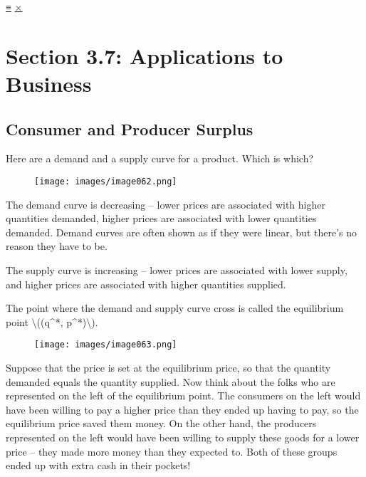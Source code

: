 \protect\hyperlink{main-nav}{≡} \protect\hyperlink{close-nav}{×}

\hypertarget{section-3.7-applications-to-business}{%
\section{Section 3.7: Applications to
Business}\label{section-3.7-applications-to-business}}

\hypertarget{consumer-and-producer-surplus}{%
\subsection{Consumer and Producer
Surplus}\label{consumer-and-producer-surplus}}

Here are a demand and a supply curve for a product. Which is which?

\begin{figure}
\centering
\texttt{[image: images/image062.png]}
\caption{}
\end{figure}

The demand curve is decreasing -- lower prices are associated with
higher quantities demanded, higher prices are associated with lower
quantities demanded. Demand curves are often shown as if they were
linear, but there's no reason they have to be.

The supply curve is increasing -- lower prices are associated with lower
supply, and higher prices are associated with higher quantities
supplied.

The point where the demand and supply curve cross is called the
equilibrium point \textbackslash{}((q\^{}*, p\^{}*)\textbackslash{}).

\begin{figure}
\centering
\texttt{[image: images/image063.png]}
\caption{}
\end{figure}

Suppose that the price is set at the equilibrium price, so that the
quantity demanded equals the quantity supplied. Now think about the
folks who are represented on the left of the equilibrium point. The
consumers on the left would have been willing to pay a higher price than
they ended up having to pay, so the equilibrium price saved them money.
On the other hand, the producers represented on the left would have been
willing to supply these goods for a lower price -- they made more money
than they expected to. Both of these groups ended up with extra cash in
their pockets!


